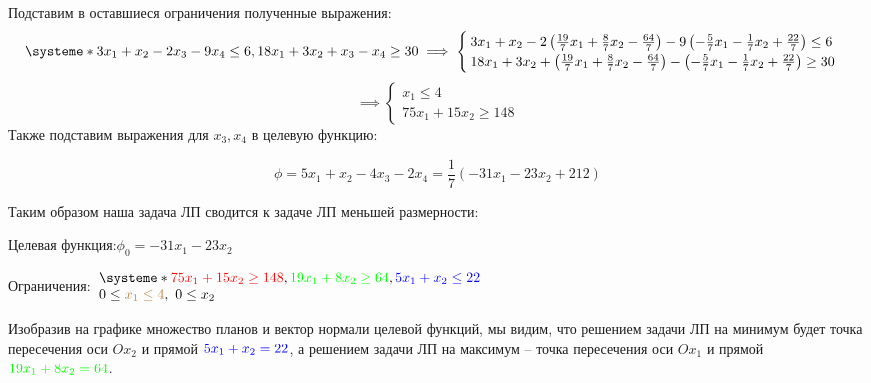 \documentclass[11pt]{article}
\makeatletter
\def\mathcolor#1#{\@mathcolor{#1}}
\def\@mathcolor#1#2#3{%
  \protect\leavevmode
  \begingroup
    \color#1{#2}#3%
  \endgroup
}
\makeatother
\begin{document}
Подставим в оставшиеся ограничения полученные выражения:
\begin{equation*}
\systeme*{  
3x_1 + x_2 - 2x_3  - 9x_4 \leq 6,
18x_1 + 3x_2 +x_3  - x_4 \geq 30}\\ \implies
\begin{cases} 
3x_1 + x_2 - 2\left(\frac{19}7x_1  + \frac87x_2  -\frac{64}7\right)  - 9\left(-\frac57x_1 - \frac17x_2 +  \frac{22}7\right) \leq 6\\
18x_1 + 3x_2 +\left(\frac{19}7x_1  + \frac87x_2  -\frac{64}7\right) - \left(-\frac57x_1 - \frac17x_2 +  \frac{22}7\right) \geq 30
\end{cases}
\end{equation*}
\begin{equation*}
 \implies
\begin{cases} 
x_1  \leq 4\\
75x_1 + 15x_2  \geq 148
\end{cases}
\end{equation*}
Также подставим выражения для $x_3, x_4$ в целевую функцию: 

\begin{equation*}
\phi = 5x_1 + x_2 - 4x_3 - 2x_4 = \frac17(-31x_1 - 23x_2 + 212)
\end{equation*}

Таким образом наша задача ЛП сводится к задаче ЛП меньшей размерности:

Целевая функция:\quad  $\phi_0 = -31x_1 - 23x_2$

\hfill

Ограничения:\quad $
\begin{array}{l}
\systeme*{  
\mathcolor{red}{75x_1 + 15x_2  \geq 148}, 
\mathcolor{green}{19x_1  +8x_2  \geq 64}, 
\mathcolor{blue}{5x_1 + x_2 \leq 22}}\\
0\leq \mathcolor{brown}{x_1 \leq 4},\ 0 \leq x_2 
\end{array}$

\hfill

Изобразив на графике множество планов и 
вектор нормали целевой функций, мы видим, что решением
задачи ЛП на минимум будет точка пересечения оси $Ox_2$ и
прямой $ \mathcolor{blue}{5x_1 + x_2 = 22}$, а решением задачи
ЛП на максимум -- точка пересечения оси $Ox_1$ и прямой \  $\mathcolor{green}{19x_1  +8x_2  = 64}$.

\hfill
\end{document}

